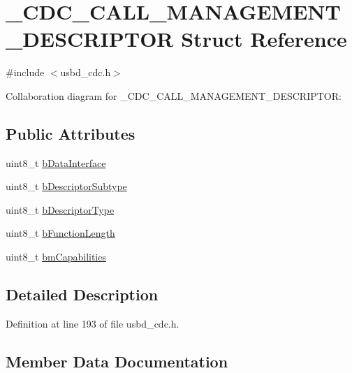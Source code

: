 \hypertarget{struct__CDC__CALL__MANAGEMENT__DESCRIPTOR}{}\section{\+\_\+\+C\+D\+C\+\_\+\+C\+A\+L\+L\+\_\+\+M\+A\+N\+A\+G\+E\+M\+E\+N\+T\+\_\+\+D\+E\+S\+C\+R\+I\+P\+T\+OR Struct Reference}
\label{struct__CDC__CALL__MANAGEMENT__DESCRIPTOR}


{\ttfamily \#include $<$usbd\+\_\+cdc.\+h$>$}



Collaboration diagram for \+\_\+\+C\+D\+C\+\_\+\+C\+A\+L\+L\+\_\+\+M\+A\+N\+A\+G\+E\+M\+E\+N\+T\+\_\+\+D\+E\+S\+C\+R\+I\+P\+T\+OR\+:
\subsection*{Public Attributes}
\begin{DoxyCompactItemize}
\item 
uint8\+\_\+t \hyperlink{struct__CDC__CALL__MANAGEMENT__DESCRIPTOR_ac78c72c5ec7c4aeba89379c07041037a}{b\+Data\+Interface}
\item 
uint8\+\_\+t \hyperlink{struct__CDC__CALL__MANAGEMENT__DESCRIPTOR_a3e1abaaf7e6ed4f46ad8cd52fd82d47a}{b\+Descriptor\+Subtype}
\item 
uint8\+\_\+t \hyperlink{struct__CDC__CALL__MANAGEMENT__DESCRIPTOR_ad0b4159e2168c9715af11ff5e74c2fd8}{b\+Descriptor\+Type}
\item 
uint8\+\_\+t \hyperlink{struct__CDC__CALL__MANAGEMENT__DESCRIPTOR_a67c9d008203a3eca2b11bfaead2ee508}{b\+Function\+Length}
\item 
uint8\+\_\+t \hyperlink{struct__CDC__CALL__MANAGEMENT__DESCRIPTOR_ac915bf6e709a2cd06bd424a033c96a9b}{bm\+Capabilities}
\end{DoxyCompactItemize}


\subsection{Detailed Description}


Definition at line 193 of file usbd\+\_\+cdc.\+h.



\subsection{Member Data Documentation}
